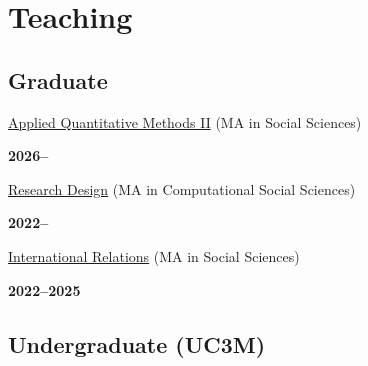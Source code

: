 \documentclass[a4paper, 12pt]{article}
\begin{document}
\section*{Teaching}


\subsection*{Graduate}

\begin{minipage}[t]{0.85\textwidth}
\href{https://franvillamil.github.io/AQM2/}{Applied Quantitative Methods II} (MA in Social Sciences)\\\vspace{-8pt}
\end{minipage}\hfill\begin{minipage}[t]{0.12\textwidth}
\flushright\textbf{2026--}
\end{minipage}
\begin{minipage}[t]{0.85\textwidth}
\href{https://franvillamil.github.io/res_design/}{Research Design} (MA in Computational Social Sciences)\\\vspace{-8pt}
\end{minipage}\hfill\begin{minipage}[t]{0.12\textwidth}
\flushright\textbf{2022--}
\end{minipage}
\begin{minipage}[t]{0.85\textwidth}
\href{https://raw.githack.com/franvillamil/syllabi/master/current/syllabus_IR.pdf}{International Relations} (MA in Social Sciences)\\\vspace{-8pt}
\end{minipage}\hfill\begin{minipage}[t]{0.12\textwidth}
\flushright\textbf{2022--2025}
\end{minipage}

\subsection*{Undergraduate (UC3M)}
\end{document}
